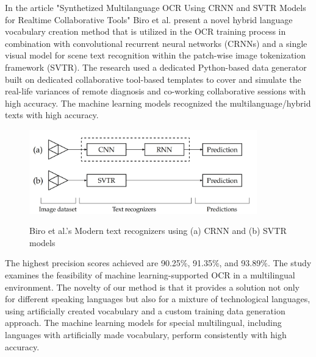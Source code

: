 In the article "Synthetized Multilanguage OCR Using CRNN and SVTR Models for Realtime Collaborative Tools" Biro et al. present a novel hybrid language vocabulary creation method that is utilized in the OCR training process in combination with convolutional recurrent neural networks (CRNNs) and a single visual model for scene text recognition within the patch-wise image tokenization framework (SVTR). The research used a dedicated Python-based data generator built on dedicated collaborative tool-based templates to cover and simulate the real-life variances of remote diagnosis and co-working collaborative sessions with high accuracy. The machine learning models recognized the multilanguage/hybrid texts with high accuracy.

\begin{figure}[ht]
    \centering
    \includegraphics[width=0.88\textwidth]{Figures/CRNN_Papers/Biro_2023.jpg}
    \caption[Biro et al.'s Modern Recogniser]{Biro et al.'s Modern text recognizers using (a) CRNN and (b) SVTR models}\cite{biroSynthetizedMultilanguageOCR2023}
    \label{fig:Biro et al.'s Modern text recognizers using CRNN and SVTR models}
\end{figure}


The highest precision scores achieved are 90.25\%, 91.35\%, and 93.89\%. The study examines the feasibility of machine learning-supported OCR in a multilingual environment. The novelty of our method is that it provides a solution not only for different speaking languages but also for a mixture of technological languages, using artificially created vocabulary and a custom training data generation approach. The machine learning models for special multilingual, including languages with artificially made vocabulary, perform consistently with high accuracy. \cite{biroSynthetizedMultilanguageOCR2023}



